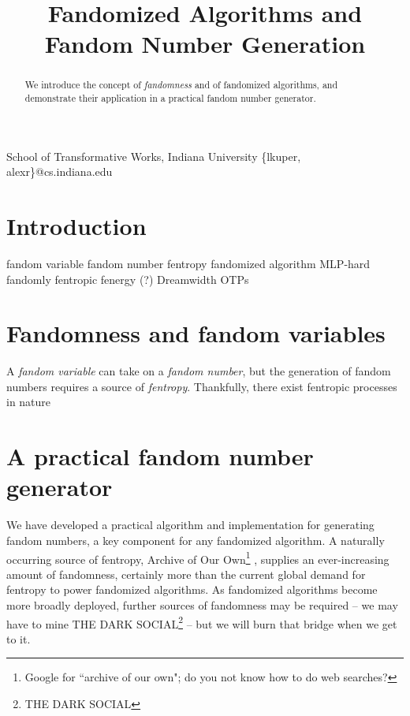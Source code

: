 \documentclass[9pt]{sigplanconf}
\begin{document}
\title{Fandomized Algorithms and Fandom Number Generation}

           {School of Transformative Works, Indiana University}
           {\{lkuper, alexr\}@cs.indiana.edu}

\maketitle

\begin{abstract}
We introduce the concept of \emph{fandomness} and of fandomized algorithms, and
demonstrate their application in a practical fandom number generator.
\end{abstract}

\section{Introduction}

fandom variable
fandom number
fentropy
fandomized algorithm
MLP-hard
fandomly
fentropic
fenergy (?)
Dreamwidth
OTPs

\section{Fandomness and fandom variables}

A \emph{fandom variable} can take on a \emph{fandom number}, but the
generation of fandom numbers requires a source of
\emph{fentropy}. Thankfully, there exist fentropic processes in nature

\section{A practical fandom number generator}
We have developed a practical algorithm and implementation for
generating fandom numbers, a key component for any fandomized
algorithm. A naturally occurring source of fentropy, Archive of Our
Own\footnote{Google for ``archive of our own"; do you not know how to
  do web searches?\footnotemark}
, supplies an
ever-increasing amount of fandomness, certainly more than the current
global demand for fentropy to power fandomized algorithms. As
fandomized algorithms become more broadly deployed, further sources of
fandomness may be required -- we may have to mine THE DARK
SOCIAL\footnote{THE DARK SOCIAL} -- but we will burn that bridge when
we get to it.
\end{document}
